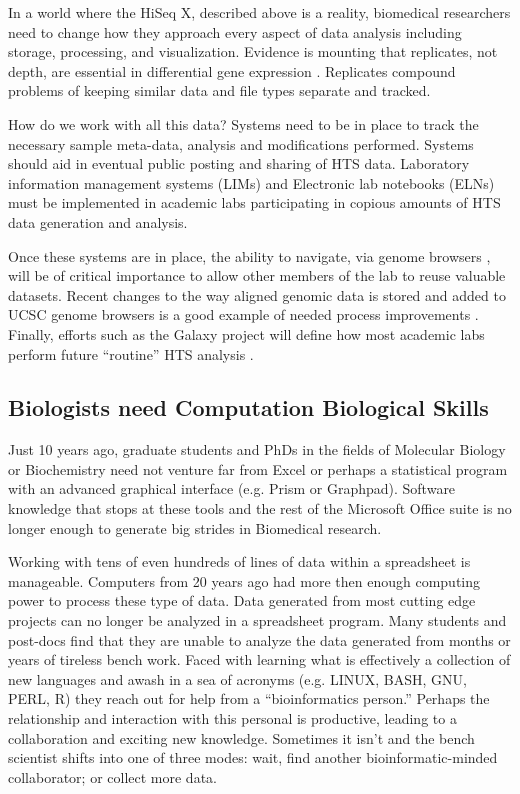     In a world where the HiSeq X, described above is a reality, biomedical researchers need to change how they approach every aspect of data analysis including storage, processing, and visualization. Evidence is mounting that replicates, not depth, are essential in differential gene expression \citep{Liu2014}. Replicates compound problems of keeping similar data and file types separate and tracked.

    How do we work with all this data? Systems need to be in place to track the necessary sample meta-data, analysis and modifications performed. Systems should aid in eventual public posting and sharing of HTS data. Laboratory information management systems (LIMs) and Electronic lab notebooks (ELNs) must be implemented in academic labs participating in copious amounts of HTS data generation and analysis.

    Once these systems are in place, the ability to navigate, via genome browsers \citep{Zweig2008,Robinson2011}, will be of critical importance to allow other members of the lab to reuse valuable datasets. Recent changes to the way aligned genomic data is stored and added to UCSC genome browsers is a good example of needed process improvements \citep{Raney2013}. Finally, efforts such as the Galaxy project will define how most academic labs perform future ``routine'' HTS analysis \citep{Blankenberg2010}.

  \subsection{Biologists need Computation Biological Skills}
    \label{Disc:subsec:Biologists need Comp Skills}

    Just 10 years ago, graduate students and PhDs in the fields of Molecular Biology or Biochemistry need not venture far from Excel or perhaps a statistical program with an advanced graphical interface (e.g. Prism or Graphpad). Software knowledge that stops at these tools and the rest of the Microsoft Office suite is no longer enough to generate big strides in Biomedical research.

    Working with tens of even hundreds of lines of data within a spreadsheet is manageable. Computers from 20 years ago had more then enough computing power to process these type of data. Data generated from most cutting edge projects can no longer be analyzed in a spreadsheet program. Many students and post-docs find that they are unable to analyze the data generated from months or years of tireless bench work. Faced with learning what is effectively a collection of new languages and awash in a sea of acronyms (e.g. LINUX, BASH, GNU, PERL, R) they reach out for help from a ``bioinformatics person.'' Perhaps the relationship and interaction with this personal is productive, leading to a collaboration and exciting new knowledge. Sometimes it isn't and the bench scientist shifts into one of three modes: wait, find another bioinformatic-minded collaborator; or collect more data.

